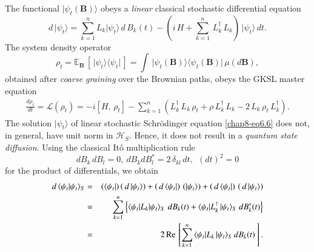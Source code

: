 The functional $\vert\psi_t(\mathbf{B})\rangle$ obeys a {\em linear} classical stochastic differential equation 
\begin{equation}
d\, \vert\psi_t\rangle=  \sum_{k=1}^n L_k \vert\psi_t\rangle\, d\,B_k(t)-( i\, H + \sum_{k=1}^n\, L^\dag_k\, L_k)\, \vert\psi_t\rangle\, dt. \label{chap8-eq6.6}
\end{equation}      
The system density operator 
\begin{equation}
\rho_t=\mathbb{E}_\mathbf{B}\,[\,\vert\psi_t\rangle\langle \psi_t\vert\,]=\int\, 
\vert\psi_t(\mathbf{B})\rangle\langle\psi_t(\mathbf{B})\vert\, \mu(d\mathbf{B}), \label{chap8-eq6.7}
\end{equation}
obtained after {\em coarse graining} over the Brownian paths,  obeys the  GKSL master equation 
\begin{eqnarray}
\frac{d \rho_t}{dt} =\mathcal{L}(\rho_t)= -i [H,\, \rho_t]- \sum_{k=1}^{n}\left(L^\dag_k\, L_k\, \rho_t + \rho\, L^\dag_k\, L_k - 2\, L_k\, \rho_t\, L^\dag_k\right). \label{chap8-eq6.8}
\end{eqnarray}
The solution $\vert\psi_t\rangle$ of linear stochastic Schr{\"o}dinger equation \eqref{chap8-eq6.6} does not, in general, have unit norm in $\mathcal{H}_S$. Hence, it  does not result in  a {\em quantum state diffusion}. Using the classical It{\^o} multiplication rule~\cite{chap8-key38}
\begin{equation}
dB_k\,dB_l=0, \ dB_k dB^*_l=2\,\delta_{kl}\, dt,\ \ (dt)^2=0 \label{chap8-eq6.9}
\end{equation} 
for the product of differentials, we obtain 
\begin{eqnarray} 
d\, \langle \psi_t\vert \psi_t\rangle_S &=&  (\langle \psi_t\vert) 
\left(\, d\, \vert\psi_t\rangle\right) + \left(\,d\, \langle \psi_t\vert\right)\,  (\vert \psi_t\rangle)
+ \left(\,d\, \langle \psi_t\vert\right)\, \left(\,d\, \vert \psi_t\rangle\right)  \nonumber \\ 
&=& \sum_{k=1}^{n}\left\{\langle \psi_t\vert L_k\vert\psi_t\rangle_S\,\, dB_k(t) + 
\langle \psi_t\vert L_k^\dag\,\vert\psi_t\rangle_S\ dB_k^*(t)\right\} \nonumber \\ 
&=& 2\, {\rm Re}\, \left[\sum_{k=1}^n\,\langle \psi_t\vert L_k\,\vert\psi_t\rangle_S\, dB_k(t)\,\right]. \label{chap8-eq6.10}
\end{eqnarray}   

